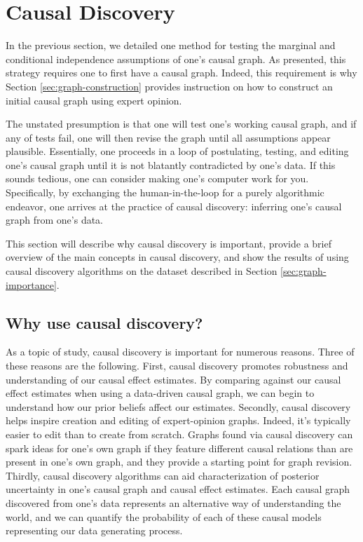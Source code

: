 \section{Causal Discovery}
\label{sec:causal-discovery}

In the previous section, we detailed one method for testing the marginal and conditional independence assumptions of one's causal graph.
As presented, this strategy requires one to first have a causal graph.
Indeed, this requirement is why Section \ref{sec:graph-construction} provides instruction on how to construct an initial causal graph using expert opinion.

The unstated presumption is that one will test one's working causal graph, and if any of tests fail, one will then revise the graph until all assumptions appear plausible.
Essentially, one proceeds in a loop of postulating, testing, and editing one's causal graph until it is not blatantly contradicted by one's data.
If this sounds tedious, one can consider making one's computer work for you.
Specifically, by exchanging the human-in-the-loop for a purely algorithmic endeavor, one arrives at the practice of  causal discovery: inferring one's causal graph from one's data.

This section will describe why causal discovery is important, provide a brief overview of the main concepts in causal discovery, and show the results of using causal discovery algorithms on the dataset described in Section \ref{sec:graph-importance}.

\subsection{Why use causal discovery?}

As a topic of study, causal discovery is important for numerous reasons.
Three of these reasons are the following.
First, causal discovery promotes robustness and understanding of our causal effect estimates.
By comparing against our causal effect estimates when using a data-driven causal graph, we can begin to understand how our prior beliefs affect our estimates.
Secondly, causal discovery helps inspire creation and editing of expert-opinion graphs.
Indeed, it's typically easier to edit than to create from scratch.
Graphs found via causal discovery can spark ideas for one's own graph if they feature different causal relations than are present in one's own graph, and they provide a starting point for graph revision.
Thirdly, causal discovery algorithms can aid characterization of posterior uncertainty in one's causal graph and causal effect estimates.
Each causal graph discovered from one's data represents an alternative way of understanding the world, and we can quantify the probability of each of these causal models representing our data generating process.

